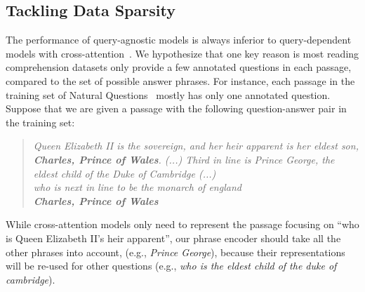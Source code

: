 \documentclass[11pt,a4paper]{article}
\begin{document}
\subsection{Tackling Data Sparsity}\label{sec:data_sparsity}
The performance of query-agnostic models is always inferior to query-dependent models with cross-attention~\citep{devlin2019bert}. We hypothesize that one key reason is most reading comprehension datasets only provide a few annotated questions in each passage, compared to the set of possible answer phrases. For instance, each passage in the training set of Natural Questions~\cite{kwiatkowski2019natural} mostly has only one annotated question.  Suppose that we are given a passage with the following question-answer pair in the training set:












\begin{comment}
\begin{quote}
\small
 \textit{\textbf{Peter Gardner Ostrum} (... ; born November 1957) is (...) former child actor whose only film role was as Charlie Bucket (...)}\\
 \textit{who played charlie bucket in the original charlie and the chocolate factory} \\
 \textit{\textbf{Peter Gardner Ostrum}}
\end{quote}
\end{comment}

\begin{quote}
\small
 \textit{Queen Elizabeth II is the sovereign, and her heir apparent is her eldest son, \textbf{Charles, Prince of Wales}. (...) Third in line is Prince George, the eldest child of the Duke of Cambridge (...)} \\
 \textit{who is next in line to be the monarch of england} \\
 \textit{\textbf{Charles, Prince of Wales}}
\end{quote}
\vspace{-0.5em}
\noindent While cross-attention models only need to represent the passage focusing on ``who is Queen Elizabeth II's heir apparent'', our phrase encoder should take all the other phrases into account, (e.g.,  \textit{Prince George}), because their representations will be re-used for other questions (e.g.,  \textit{who is the eldest child of the duke of cambridge}).
\end{document}
